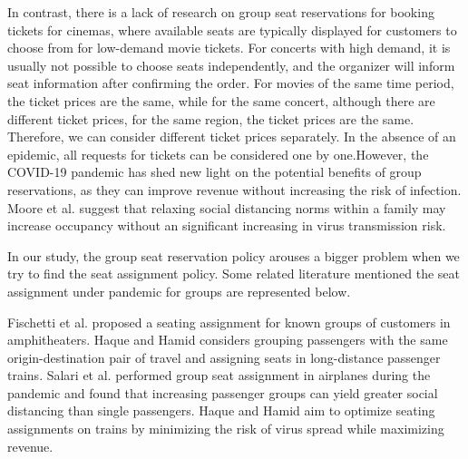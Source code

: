 In contrast, there is a lack of research on group seat reservations for booking tickets for cinemas, where available seats are typically displayed for customers to choose from for low-demand movie tickets. For concerts with high demand, it is usually not possible to choose seats independently, and the organizer will inform seat information after confirming the order. 
For movies of the same time period, the ticket prices are the same, while for the same concert, although there are different ticket prices, for the same region, the ticket prices are the same. Therefore, we can consider different ticket prices separately. 
In the absence of an epidemic, all requests for tickets can be considered one by one.However, the COVID-19 pandemic has shed new light on the potential benefits of group reservations, as they can improve revenue without increasing the risk of infection. Moore et al. \cite{moore2021seat} suggest that relaxing social distancing norms within a family may increase occupancy without an significant increasing in virus transmission risk.


In our study, the group seat reservation policy arouses a bigger problem when we try to find the seat assignment policy. Some related literature mentioned the seat assignment under pandemic for groups are represented below.

Fischetti et al. \cite{fischetti2021safe} proposed a seating assignment for known groups of customers in amphitheaters. Haque and Hamid \cite{haque2022optimization} considers grouping passengers with the same origin-destination pair of travel and assigning seats in long-distance passenger trains. Salari et al. \cite{salari2022social} performed group seat assignment in airplanes during the pandemic and found that increasing passenger groups can yield greater social distancing than single passengers. Haque and Hamid \cite{haque2023social} aim to optimize seating assignments on trains by minimizing the risk of virus spread while maximizing revenue. 

